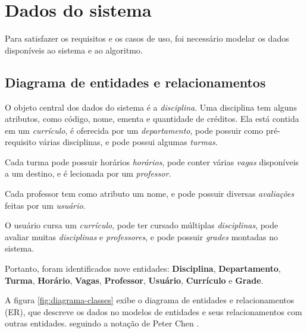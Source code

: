 \chapter{Dados do sistema}
\label{cha:Dados do sistema}

Para satisfazer os requisitos e os casos de uso, foi necessário modelar os dados disponíveis ao sistema e ao algoritmo.

\section{Diagrama de entidades e relacionamentos}

O objeto central dos dados do sistema é a \textit{disciplina}. Uma disciplina tem alguns atributos, como código, nome, ementa e quantidade de créditos. Ela está contida em um \textit{currículo}, é oferecida por um \textit{departamento}, pode possuir como pré-requisito várias disciplinas, e pode possui algumas \textit{turmas}.

Cada turma pode possuir horários \textit{horários}, pode conter várias \textit{vagas} disponíveis a um destino, e é lecionada por um \textit{professor}.

Cada professor tem como atributo um nome, e pode possuir diversas \textit{avaliações} feitas por um \textit{usuário}.

O usuário cursa um \textit{currículo}, pode ter cursado múltiplas \textit{disciplinas}, pode avaliar muitas \textit{disciplinas} e \textit{professores}, e pode possuir \textit{grades} montadas no sistema.

Portanto, foram identificados nove entidades: \textbf{Disciplina}, \textbf{Departamento}, \textbf{Turma}, \textbf{Horário}, \textbf{Vagas}, \textbf{Professor}, \textbf{Usuário}, \textbf{Currículo} e \textbf{Grade}.

A figura \ref{fig:diagrama-classes} exibe o diagrama de entidades e relacionamentos (ER), que descreve os dados no modelos de entidades e seus relacionamentos com outras entidades. seguindo a notação de Peter Chen \cite{peter-chen}. 

